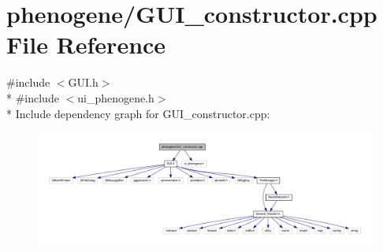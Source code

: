 \hypertarget{a00011}{\section{phenogene/\-G\-U\-I\-\_\-constructor.cpp File Reference}
\label{da/d45/a00011}
}
{\ttfamily \#include $<$G\-U\-I.\-h$>$}\\*
{\ttfamily \#include $<$ui\-\_\-phenogene.\-h$>$}\\*
Include dependency graph for G\-U\-I\-\_\-constructor.\-cpp\-:
\nopagebreak
\begin{figure}[H]
\begin{center}
\leavevmode
\includegraphics[width=350pt]{df/d61/a00031}
\end{center}
\end{figure}
